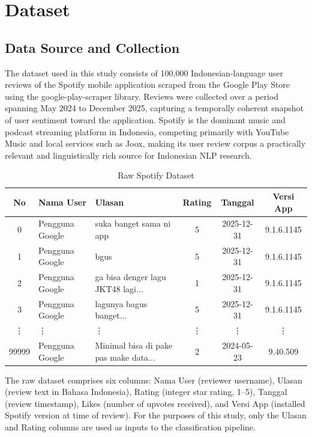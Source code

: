 \documentclass{article}
\begin{document}
\section{Dataset}
\label{sec:dataset}

\subsection{Data Source and Collection}
The dataset used in this study consists of 100,000 Indonesian-language user reviews of the Spotify mobile application scraped from the Google Play Store using the {google-play-scraper} library. Reviews were collected over a period spanning May 2024 to December 2025, capturing a temporally coherent snapshot of user sentiment toward the application. Spotify is the dominant music and podcast streaming platform in Indonesia, competing primarily with YouTube Music and local services such as Joox, making its user review corpus a practically relevant and linguistically rich source for Indonesian NLP research.

\begin{table}[H]
\centering
\caption{Raw Spotify Dataset}
\label{tab:raw_dataset}
\begin{tabular}{cllccc}
\toprule
\textbf{No} & \textbf{Nama User} & \textbf{Ulasan} & \textbf{Rating} & \textbf{Tanggal} & \textbf{Versi App} \\ \midrule
0 & Pengguna Google & suka banget sama ni app & 5 & 2025-12-31 & 9.1.6.1145 \\
1 & Pengguna Google & bgus & 5 & 2025-12-31 & 9.1.6.1145 \\
2 & Pengguna Google & ga bisa denger lagu JKT48 lagi... & 1 & 2025-12-31 & 9.1.6.1145 \\
3 & Pengguna Google & lagunya bagus banget... & 5 & 2025-12-31 & 9.1.6.1145 \\
\vdots & \vdots & \vdots & \vdots & \vdots & \vdots \\
99999 & Pengguna Google & Minimal bisa di pake pas make data... & 2 & 2024-05-23 & 9.40.509 \\ \bottomrule
\end{tabular}
\end{table}

The raw dataset comprises six columns: Nama User (reviewer username), Ulasan (review text in Bahasa Indonesia), Rating (integer star rating, 1–5), Tanggal (review timestamp), Likes (number of upvotes received), and Versi App (installed Spotify version at time of review). For the purposes of this study, only the Ulasan and Rating columns are used as inputs to the classification pipeline.
\end{document}
